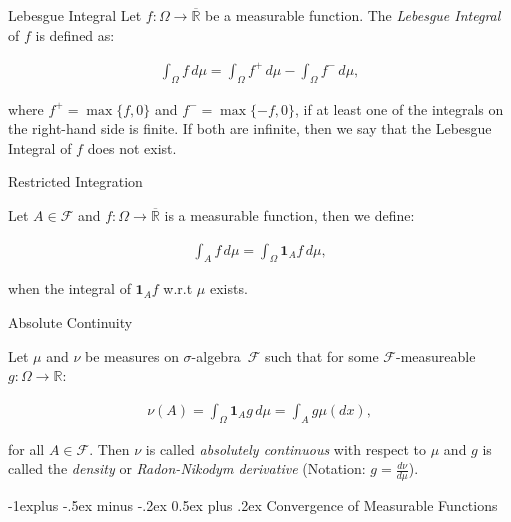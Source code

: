 \documentclass[10pt,landscape]{article}
\makeatletter
\newcommand{\SigmaAlgebra}{$\sigma$-algebra}
\newcommand{\Indicator}[1]{\mathbf{1}_{#1}}
\newcommand{\CalF}{\mathcal{F}}
\renewcommand{\subsection}{\@startsection{subsection}{2}{0mm}%
                                {-1explus -.5ex minus -.2ex}%
                                {0.5ex plus .2ex}%
                                {\normalfont\normalsize\bfseries}}
\makeatother
\begin{document}
\begin{multicols}{3}
\begin{definition}{}{Lebesgue Integral}
     Let $f: \Omega \to \overline{\mathbb{R}}$ be a measurable function. The \emph{Lebesgue Integral} of $f$ is defined as:

        \begin{align*}
            \int_{\Omega} f \,d\mu = \int_{\Omega} f^+ \,d\mu - \int_{\Omega} f^- \,d\mu,
        \end{align*}

    where $f^+ = \max\{f, 0\}$ and $f^-=\max\{-f, 0\}$, if at least one of the integrals on the right-hand side is finite. If both are infinite, then we say that the Lebesgue Integral of $f$ does not exist.

\end{definition}

\begin{definition}{}{Restricted Integration}

    Let $A \in \CalF$ and $f: \Omega \to \overline{\mathbb{R}}$ is a measurable function, then we define:

        \begin{align*}
            \int_A f \, d\mu = \int_{\Omega} \Indicator{A} f \, d\mu,
        \end{align*}

    when the integral of $\Indicator{A} f$ w.r.t $\mu$ exists.

\end{definition}

\begin{definition}{3.7}{Absolute Continuity}

    Let $\mu$ and $\nu$ be measures on \SigmaAlgebra\ $\CalF$ such that for some $\CalF$-measureable $g: \Omega \to \mathbb{R}$:

        \begin{align*}
            \nu(A) = \int_{\Omega} \Indicator{A} g \, d\mu = \int_{A} g \mu(dx),
        \end{align*}

    for all $A \in \CalF$. Then $\nu$ is called \emph{absolutely continuous} with respect to $\mu$ and $g$ is called the \emph{density} or \emph{Radon-Nikodym derivative} (Notation: $g = \frac{d\nu}{d\mu}$).

\end{definition}

\subsection{Convergence of Measurable Functions}


\end{multicols}
\end{document}
